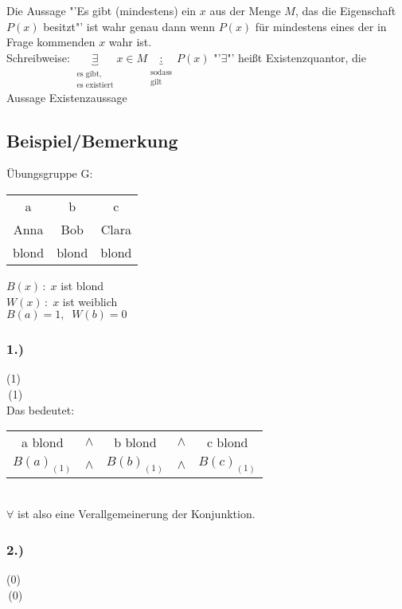 \documentclass[10pt,a4paper,titlepage,fleqn]{article}
\begin{document}
\subsubsection{} Die Aussage "'Es gibt (mindestens) ein $x$ aus der Menge $M$, das die Eigenschaft $P(x)$
	besitzt"' ist wahr genau dann wenn $P(x)$ für mindestens eines der in Frage 
	\vspace{0.5em} kommenden $x$ wahr ist.\\
	\textsf{Schreibweise: } $\underbrace{\exists}_{\substack{\text{es gibt,}\\\text{es existiert}}} x \in M
	\underbrace{:}_{\substack{\text{sodass}\\\text{gilt}}} P(x)$ \quad "'$\exists$"' heißt 
	Existenzquantor, die Aussage Existenzaussage
\subsection{Beispiel/Bemerkung}
	Übungsgruppe G: 
	\begin{tabular}{ccc}
		a & b & c\\
		Anna & Bob & Clara\\
		blond & blond & blond
	\end{tabular}\hfill\break
	$B(x)\,:\;x$ ist blond\\
	$W(x)\,:\;x$ ist weiblich\\
	$B(a)=1,\;\;W(b)=0$
\subsubsection*{1.) } (1)\\
	\,\vspace{0.5em}(1)\\
	Das bedeutet: 
	\begin{tabular}{ccccc}
	a blond &$\wedge$& b blond &$\wedge$& c blond\\
	${B(a)}_{(1)}$ &$\wedge$& ${B(b)}_{(1)}$ &$\wedge$& ${B(c)}_{(1)}$
	\end{tabular}\\
	$\forall$ ist also eine Verallgemeinerung der Konjunktion.\\
\subsubsection*{2.) } (0)\\
	\,(0)
\end{document}
